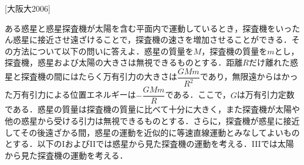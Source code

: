 


\noindent
{} [大阪大2006]

ある惑星と惑星探査機が太陽を含む平面内で運動しているとき，探査機をいったん惑星に接近させ遠ざけることで，探査機の速さを増加させることができる．その方法について以下の問いに答えよ．惑星の質量を$M$，探査機の質量を$m$とし，探査機，惑星および太陽の大きさは無視できるものとする．距離$R$だけ離れた惑星と探査機の間にはたらく万有引力の大きさは$\dfrac{GMm}{R^2}$であり，無限遠からはかった万有引力による位置エネルギーは$-\dfrac{GMm}{R}$である．ここで，$G$は万有引力定数である．惑星の質量は探査機の質量に比べて十分に大きく，また探査機が太陽や他の惑星から受ける引力は無視できるものとする．さらに，探査機が惑星に接近してその後遠ざかる間，惑星の運動を近似的に等速直線運動とみなしてよいものとする．以下のIおよびIIでは惑星から見た探査機の運動を考える．IIIでは太陽から見た探査機の運動を考える．

